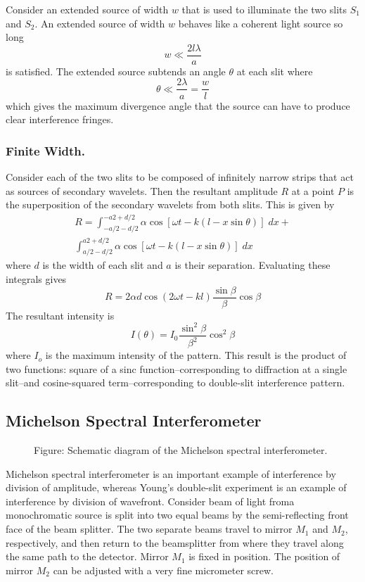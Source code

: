 \documentclass[../../../main.tex]{subfiles}
\begin{document}
Consider an extended source of width $w$ that is used to illuminate the two slits $S_1$ and $S_2$.  An extended source of width $w$ behaves like a coherent light source so long
\begin{equation*}
    w\ll \frac{2l\lambda}{a}
\end{equation*}
is satisfied. The extended source subtends an angle $\theta$ at each slit where
\begin{equation*}
    \theta\ll \frac{2\lambda}{a}=\frac{w}{l}
\end{equation*}
which gives the maximum divergence angle that the source can have to produce clear interference fringes.

\subsubsection{Finite Width.} Consider each of the two slits to be composed of infinitely narrow strips that act as sources of secondary wavelets. Then the resultant amplitude $R$ at a point $P$ is the superposition of the secondary wavelets from both slits. This is given by
\begin{multline*}
    R=\int_{-a/2-d/2}^{-a2+d/2}\alpha \cos[\omega t- k(l-x\sin \theta)]\;dx+\\ \int_{a/2-d/2}^{a2+d/2}\alpha \cos[\omega t- k(l-x\sin \theta)]\;dx
\end{multline*}
where $d$ is the width of each slit and $a$ is their separation. Evaluating these integrals gives
\begin{equation*}
    R=2\alpha d \cos(2\omega t - kl)\frac{\sin \beta}{\beta}\cos \beta
\end{equation*}
The resultant intensity is
\begin{equation*}
    I(\theta)=I_0\frac{\sin^2 \beta}{\beta^2}\cos^2 \beta
\end{equation*}
where $I_o$ is the maximum intensity of the pattern. This result is the product of two functions: square of a sinc function--corresponding to diffraction at a single slit--and cosine-squared term--corresponding to double-slit interference pattern.

\subsection{Michelson Spectral Interferometer}
\begin{figure*}
    \centering
    \caption*{Figure: Schematic diagram of the Michelson spectral interferometer.}
\end{figure*}
Michelson spectral interferometer is an important example of interference by division of amplitude, whereas Young's double-slit experiment is an example of interference by division of wavefront. Consider beam of light froma monochromatic source is split into two equal beams by the semi-reﬂecting front face of the beam splitter. The two separate beams travel to mirror $M_1$ and $M_2$, respectively, and then return to the beamsplitter from where they travel along the same path to the detector. Mirror $M_1$ is ﬁxed in position. The position of mirror $M_2$ can be adjusted with a very ﬁne micrometer screw. 
\end{document}
